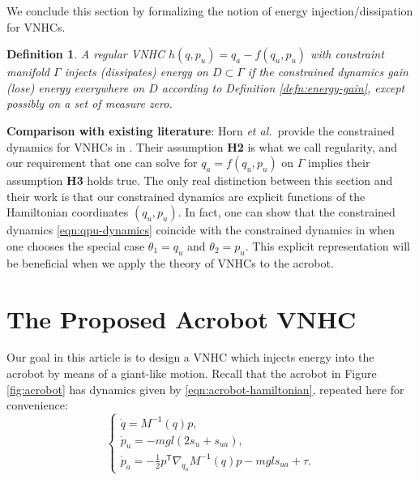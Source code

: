 \documentclass[journal,twoside,web, twocolumn,draftcls]{ieeecolor}
\newtheorem{defn}{Definition} %
\newcommand*{\tpose}{^\mathsf{T}}
\newcommand*{\Minv}{M^\mathsf{-1}}
\newcommand*{\etal}{\MakeLowercase{\textit{et al.~}}}
\begin{document}
We conclude this section by formalizing the notion of energy
injection/dissipation for VNHCs.

\begin{defn}\label{defn:energy-injection}
    A regular VNHC \(h(q,p_u) = q_a - f(q_u,p_u)\) with constraint manifold \(\Gamma\)
    \textit{injects (dissipates) energy on \(D \subset \Gamma\)} if the
    constrained dynamics gain (lose) energy everywhere on \(D\) according to
    Definition \ref{defn:energy-gain}, except possibly on a set of measure
    zero.
\end{defn}

\textbf{Comparison with existing literature}: Horn \etal provide the constrained
dynamics for VNHCs in \cite{nhvc_incline_walking}.
Their assumption \textbf{H2} is what we call regularity, and our requirement
that one can solve for \(q_a = f(q_u,p_u)\) on \(\Gamma\) implies their
assumption \textbf{H3} holds true.
The only real distinction between this section and their work is that
our constrained dynamics are explicit functions of the Hamiltonian coordinates
\((q_u,p_u)\).
In fact, one can show that the constrained dynamics \eqref{eqn:qpu-dynamics}
coincide with the constrained dynamics in
\cite[Eqn. (17)]{hybrid_zero_dynamics_bipedal_nhvcs}
when one chooses the special case \(\theta_1 = q_u\) and 
\(\theta_2 = p_u\).
This explicit representation will be beneficial when we apply the theory of
VNHCs to the acrobot.

\section{The Proposed Acrobot VNHC}\label{sec:acrobot}

Our goal in this article is to design a VNHC which injects energy into the
acrobot by means of a giant-like motion.
Recall that the acrobot in Figure \ref{fig:acrobot} has dynamics given by
\eqref{eqn:acrobot-hamiltonian}, repeated here for convenience:
    \begin{equation*}
     \begin{cases}
        \dot{q} = \Minv(q) p 
        ,\\
        \dot{p}_u = -mgl\left(2s_u + s_{ua}\right) 
        ,\\
        \dot{p}_a =-\frac{1}{2}p\tpose \nabla_{q_a}\Minv(q) p
        - mgl s_{ua} + \tau.
    \end{cases}
\end{equation*}
\end{document}
